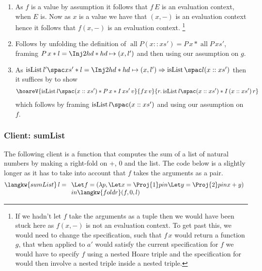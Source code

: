 \begin{enumerate}
\item As $f$ is a value by assumption it follows that $f \, E$ is an evaluation context, when $E$ is.
  Now as $x$ is a value we have that $(x, -)$ is an evaluation context hence it follows that $f (x, - )$ is an evaluation context.%
  \footnote{If we hadn't let $f$ take the arguments as a tuple then we would have been stuck here as $f (x, -)$ is not an evaluation context.
  To get past this, we would need to change the specification, such that $f \, x$ would return a function $g$, that when applied to $a'$ would satisfy the current specification for $f$ \ie{} we would have to specify $f$ using a nested Hoare triple and the specification for  would then involve a nested triple inside a nested triple.}

\item Follows by unfolding the definition of $\operatorname{all} P (x::xs') = P \, x \ast \operatorname{all} P \, xs'$, framing $P \, x \ast l = \Inj2 hd \ast hd \pointsto (x,l')$ and then using our assumption on $g$.

\item As $ \isList {l'} {xs'} \ast l = \Inj2 hd \ast hd \pointsto (x,l') \implies \isList {l} {(x::xs')} $ then it suffices by  to show
  \begin{align*}
    \hoareV{ \isList {l} {(x::xs')} \ast P\, x \ast I \, xs' \, v  }
    {f x \, v}
    {r. \isList {l} {(x::xs')} \ast I \, (x::xs') \, r}
  \end{align*}
  which follows by framing $\isList {l} {(x::xs')}$ and using our assumption
  on $f$.
\end{enumerate}

\subsubsection*{Client: sumList}
The following client is a function that computes the sum of a list of natural numbers by making a right-fold on +, 0 and the list. The code below is  a slightly longer as it has to take into account that $f$ takes the arguments as a pair. 
\begin{displaymath}
    \langkw{sumList} \, l =
    \begin{array}[t]{l}
    \Let f = (\lambda p, \Let x = \Proj{1} p in \Let y = \Proj{2} p in x + y)\\
   		 in \langkw{foldr}(f, 0, l)
    \end{array}
  \end{displaymath}

